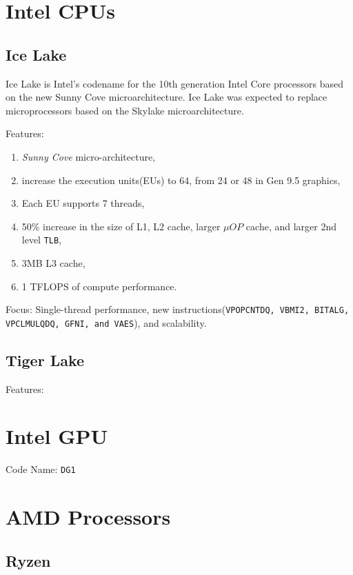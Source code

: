 \documentclass[10pt,conference]{IEEEtran}
\begin{document}
\newcommand{\todo}[1]{\color{red}\textbf{\hl{#1}}\color{black}\xspace}
\newcommand{\rom}[1]{\expandafter{\romannumeral #1\relax}}

\section{Intel CPUs}

\subsection{Ice Lake}
Ice Lake is Intel's codename for the 10th generation Intel Core processors based on the new Sunny Cove microarchitecture. 
Ice Lake was expected to replace microprocessors based on the Skylake microarchitecture.


Features:
\begin{enumerate}
\item \textit{Sunny Cove} micro-architecture,
\item increase the execution units(EUs) to 64, from 24 or 48 in Gen 9.5 graphics,
\item Each EU supports 7 threads,
\item 50\% increase in the size of L1, L2 cache, larger $\mu OP$ cache, and larger 2nd level \texttt{TLB},
\item 3MB L3 cache,
\item 1 TFLOPS of compute performance.
\end{enumerate}


Focus:
Single-thread performance, new instructions(\texttt{VPOPCNTDQ, VBMI2, BITALG, VPCLMULQDQ, GFNI, and VAES}), and scalability.


\subsection{Tiger Lake}
Features:


\section{Intel GPU}
Code Name: \texttt{DG1}\\


\section{AMD Processors}

\subsection{Ryzen}
\end{document}
